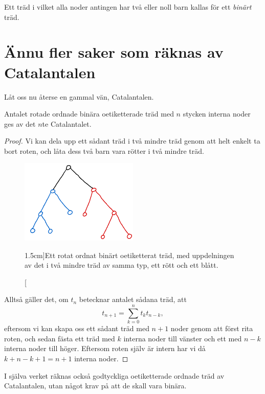 \documentclass[nobib]{tufte-handout}
\begin{document}
\begin{definition}
    Ett träd i vilket alla noder antingen har två eller noll barn kallas för ett \emph{binärt} träd.
\end{definition}

\section{Ännu fler saker som räknas av Catalantalen}

Låt oss nu återse en gammal vän, Catalantalen.

\begin{proposition}\label{prop:ROBUT_count}
    Antalet rotade ordnade binära oetiketterade träd med $n$ stycken interna noder ges av det $n$te Catalantalet.

    \begin{proof}
        Vi kan dela upp ett sådant träd i två mindre träd genom att helt enkelt ta bort roten, och låta dess två barn vara rötter i två mindre träd.

        \begin{figure}
            \centering
            \includegraphics[width=0.5\textwidth]{graphics/RUBOTree_division.png}
            \caption[][1.5cm]{Ett rotat ordnat binärt oetiketterat träd, med uppdelningen av det i två mindre träd av samma typ, ett rött och ett blått.}
        \end{figure}

        Alltså gäller det, om $t_n$ betecknar antalet sådana träd, att
        $$t_{n+1} = \sum_{k=0}^{n} t_k t_{n-k},$$
        eftersom vi kan skapa oss ett sådant träd med $n+1$ noder genom att först rita roten, och sedan fästa ett träd med $k$ interna noder till vänster och ett med $n-k$ interna noder till höger. Eftersom roten själv är intern har vi då $k + n - k + 1 = n + 1$ interna noder.
    \end{proof}
\end{proposition}

I själva verket räknas också godtyckliga oetiketterade ordnade träd av Catalantalen, utan något krav på att de skall vara binära.
\end{document}
